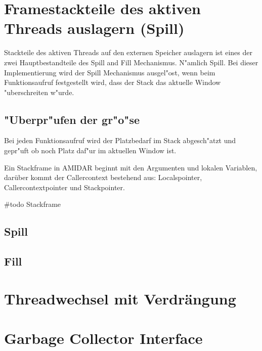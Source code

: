 \section{Framestackteile des aktiven Threads auslagern (Spill)}

Stackteile des aktiven Threads auf den externen Speicher auslagern ist eines der zwei Hauptbestandteile des Spill and Fill Mechanismus. N"amlich Spill. Bei dieser Implementierung wird der Spill Mechanismus ausgel"ost, wenn beim Funktionsaufruf festgestellt wird, dass der Stack das aktuelle Window "uberschreiten w"urde.

\subsection{"Uberpr"ufen der gr"o"se}
Bei jeden Funktionsaufruf wird der Platzbedarf im Stack abgesch"atzt und gepr"uft ob noch Platz daf"ur im aktuellen Window ist. 

Ein Stackframe in AMIDAR beginnt mit den Argumenten und lokalen Variablen, darüber kommt der Callercontext bestehend aus: Localspointer, Callercontextpointer und Stackpointer. 

#todo Stackframe

\subsection{Spill}

\subsection{Fill}

\section{Threadwechsel mit Verdr\"angung}

\section{Garbage Collector Interface}